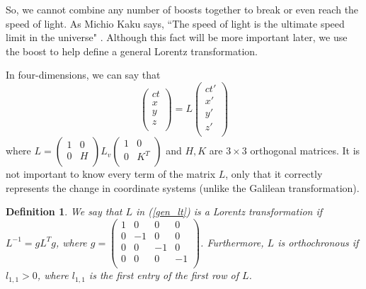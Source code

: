 \documentclass[12pt]{article}
\theoremstyle{defn}
\newtheorem{defn}{Definition}
\theoremstyle{pf}
\newcommand{\0}{\emptyset}
\renewcommand{\-}{\setminus}
\begin{document}
So, we cannot combine any number of boosts together to break or even reach the speed of light. As Michio Kaku says, ``The speed of light is the ultimate speed limit in the universe" \cite{kaku}. Although this fact will be more important later, we use the boost to help define a general Lorentz transformation. 

In four-dimensions, we can say that \begin{equation}\label{gen_lt}\left(\begin{array}{c}ct\\                                                                                                                            x\\
y\\
z\\
\end{array}\right)=L\left(\begin{array}{c}ct'\\
x'\\
y'\\
z'\\
\end{array}\right)\end{equation} where $L=\left(\begin{array}{cc}1 & 0\\
0 & H\\
\end{array}\right)L_v\left(\begin{array}{cc}1 & 0\\
0 & K^T\\
\end{array}\right)$ and $H,K$ are $3\times3$ orthogonal matrices. It is not important to know every term of the matrix $L$, only that it correctly represents the change in coordinate systems (unlike the Galilean transformation). 

\begin{defn}\label{ltdef}We say that $L$ in (\ref{gen_lt}) is a \textit{Lorentz transformation} if $L^{-1}=gL^Tg$, where $g=\left(\begin{array}{cccc}1 & 0 & 0 & 0\\
                                                                                       0 & -1 & 0 & 0\\
0 & 0 & -1 & 0\\
0 & 0 & 0 & -1\\
\end{array}\right)$. Furthermore, $L$ is \textit{orthochronous} if $l_{1,1}>0$, where $l_{1,1}$ is the first entry of the first row of $L$\cite{woodhouse}. \end{defn}
\end{document}
